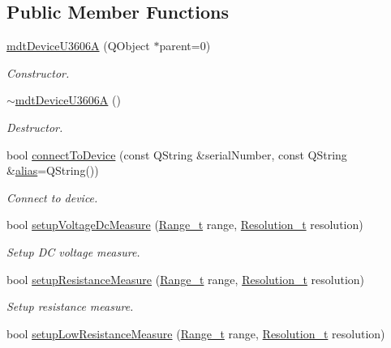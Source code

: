 \subsection*{Public Member Functions}
\begin{DoxyCompactItemize}
\item 
\hyperlink{classmdt_device_u3606_a_a91201ae14df7b553a947b5857eaa1c65}{mdt\-Device\-U3606\-A} (Q\-Object $\ast$parent=0)
\begin{DoxyCompactList}\small\item\em Constructor. \end{DoxyCompactList}\item 
\hyperlink{classmdt_device_u3606_a_a7d2fb26475e72cce95ca6be384d569b7}{$\sim$mdt\-Device\-U3606\-A} ()
\begin{DoxyCompactList}\small\item\em Destructor. \end{DoxyCompactList}\item 
bool \hyperlink{classmdt_device_u3606_a_a293ce0f0ccdbf8e7d77f644b7fc176f3}{connect\-To\-Device} (const Q\-String \&serial\-Number, const Q\-String \&\hyperlink{classmdt_device_a3aa589ecae0fa3deed61431d07db9276}{alias}=Q\-String())
\begin{DoxyCompactList}\small\item\em Connect to device. \end{DoxyCompactList}\item 
bool \hyperlink{classmdt_device_u3606_a_af71cd0206a4f91fc1b250780ceb72919}{setup\-Voltage\-Dc\-Measure} (\hyperlink{classmdt_device_u3606_a_a8171d28878e8609c98d4cea591b7cc37}{Range\-\_\-t} range, \hyperlink{classmdt_device_u3606_a_a136af13281bde380abeabe358c399dc5}{Resolution\-\_\-t} resolution)
\begin{DoxyCompactList}\small\item\em Setup D\-C voltage measure. \end{DoxyCompactList}\item 
bool \hyperlink{classmdt_device_u3606_a_ac7b3bb6534b628cce4f465796b65c74f}{setup\-Resistance\-Measure} (\hyperlink{classmdt_device_u3606_a_a8171d28878e8609c98d4cea591b7cc37}{Range\-\_\-t} range, \hyperlink{classmdt_device_u3606_a_a136af13281bde380abeabe358c399dc5}{Resolution\-\_\-t} resolution)
\begin{DoxyCompactList}\small\item\em Setup resistance measure. \end{DoxyCompactList}\item 
bool \hyperlink{classmdt_device_u3606_a_a37ee631efe112bc57c3707f266880cec}{setup\-Low\-Resistance\-Measure} (\hyperlink{classmdt_device_u3606_a_a8171d28878e8609c98d4cea591b7cc37}{Range\-\_\-t} range, \hyperlink{classmdt_device_u3606_a_a136af13281bde380abeabe358c399dc5}{Resolution\-\_\-t} resolution)

\end{DoxyCompactItemize}

